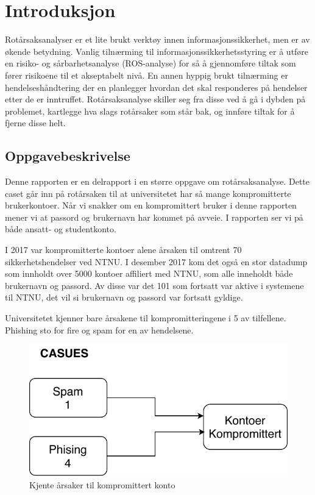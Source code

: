 \chapter{Introduksjon}
\fixme Rotårsaksanalyser er et lite brukt verktøy innen informasjonssikkerhet, men er av økende betydning. Vanlig tilnærming til informasjonssikkerhetsstyring er å utføre en risiko- og sårbarhetsanalyse (ROS-analyse) for så å gjennomføre tiltak som fører risikoene til et akseptabelt nivå. En annen hyppig brukt tilnærming er hendelseshåndtering der en planlegger hvordan det skal responderes på hendelser etter de er inntruffet. Rotårsaksanalyse skiller seg fra disse ved å gå i dybden på problemet, kartlegge hva slags rotårsaker som står bak, og innføre tiltak for å fjerne disse helt.

\section{Oppgavebeskrivelse}
Denne rapporten er en delrapport i en større oppgave om rotårsaksanalyse. Dette caset går inn på rotårsaken til at universitetet har så mange kompromitterte brukerkontoer. Når vi snakker om en kompromittert bruker i denne rapporten mener vi at passord og brukernavn har kommet på avveie. I rapporten ser vi på både ansatt- og studentkonto. 

I 2017 var kompromitterte kontoer alene årsaken til omtrent 70 sikkerhetshendelser ved NTNU. I desember 2017 kom det også en stor datadump som innholdt over 5000 kontoer affiliert med NTNU, som alle inneholdt både brukernavn og passord. Av disse var det 101 som fortsatt var aktive i systemene til NTNU, det vil si brukernavn og passord var fortsatt gyldige.

Universitetet kjenner bare årsakene til kompromitteringene i 5 av tilfellene. Phishing sto for fire og spam for en av hendelsene. 

\begin{figure}[H]
    \centering
    \includegraphics[scale=0.6]{case_2/bilder/kjente_arsaker.pdf}
    \caption[Kjente årsaker til kompromittert konto]{Kjente årsaker til kompromittert konto}
    \label{fig:kjente-arsaker-kompromittert-konto}
\end{figure}

